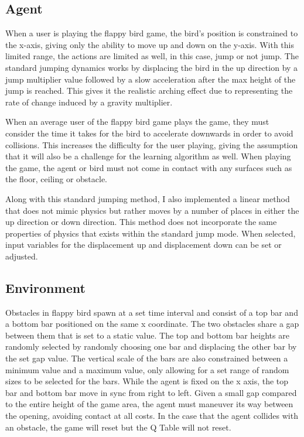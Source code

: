 \documentclass{article}
\begin{document}
\subsection{Agent}

When a user is playing the flappy bird game, the bird's position is constrained to the x-axis, giving only the ability to move up and down on the y-axis. With this limited range, the actions are limited as well, in this case, jump or not jump. The standard jumping dynamics works by displacing the bird in the up direction by a jump multiplier value followed by a slow acceleration after the max height of the jump is reached. This gives it the realistic arching effect due to representing the rate of change induced by a gravity multiplier. 

When an average user of the flappy bird game plays the game, they must consider the time it takes for the bird to accelerate downwards in order to avoid collisions. This increases the difficulty for the user playing, giving the assumption that it will also be a challenge for the learning algorithm as well. When playing the game, the agent or bird must not come in contact with any surfaces such as the floor, ceiling or obstacle. 

Along with this standard jumping method, I also implemented a linear method that does not mimic physics but rather moves by a number of places in either the up direction or down direction. This method does not incorporate the same properties of physics that exists within the standard jump mode. When selected, input variables for the displacement up and displacement down can be set or adjusted. 

\subsection{Environment}
Obstacles in flappy bird spawn at a set time interval and consist of a top bar and a bottom bar positioned on the same x coordinate. The two obstacles share a gap between them that is set to a static value. The top and bottom bar heights are randomly selected by randomly choosing one bar and displacing the other bar by the set gap value. The vertical scale of the bars are also constrained between a minimum value and a maximum value, only allowing for a set range of random sizes to be selected for the bars. While the agent is fixed on the x axis, the top bar and bottom bar move in sync from right to left. Given a small gap compared to the entire height of the game area, the agent must maneuver its way between the opening, avoiding contact at all costs. In the case that the agent collides with an obstacle, the game will reset but the Q Table will not reset.
\end{document}
